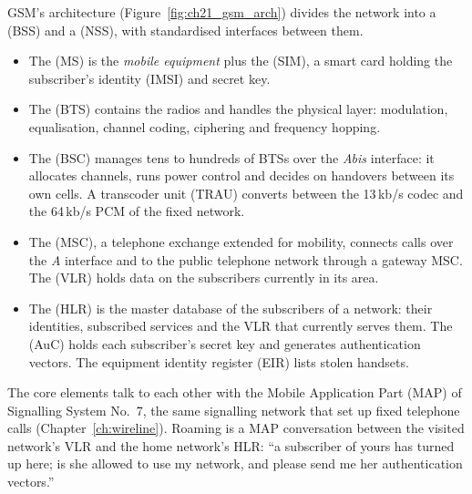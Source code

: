 GSM's architecture (Figure~\ref{fig:ch21_gsm_arch}) divides the network into a
 (BSS) and a  (NSS), with
standardised interfaces between them.
\begin{itemize}
\item The  (MS) is the \emph{mobile equipment} plus the
 (SIM), a smart card holding the subscriber's identity (IMSI) and
secret key.
\item The  (BTS) contains the radios and handles the physical layer:
modulation, equalisation, channel coding, ciphering and frequency hopping.
\item The  (BSC) manages tens to hundreds of BTSs over the \emph{Abis}
interface: it allocates channels, runs power control and decides on handovers between its own
cells. A transcoder unit (TRAU) converts between the 13\,kb/s codec and the 64\,kb/s PCM of the
fixed network.
\item The  (MSC), a telephone exchange extended for mobility, connects
calls over the \emph{A} interface and to the public telephone network through a gateway MSC. The
 (VLR) holds data on the subscribers currently in its area.
\item The  (HLR) is the master database of the subscribers of a
network: their identities, subscribed services and the VLR that currently serves them. The
 (AuC) holds each subscriber's secret key and generates authentication
vectors. The equipment identity register (EIR) lists stolen handsets.
\end{itemize}
The core elements talk to each other with the Mobile Application Part (MAP) of Signalling System
No.~7, the same signalling network that set up fixed telephone calls (Chapter~\ref{ch:wireline}).
Roaming is a MAP conversation between the visited network's VLR and the home network's HLR: ``a
subscriber of yours has turned up here; is she allowed to use my network, and please send me her
authentication vectors.''

